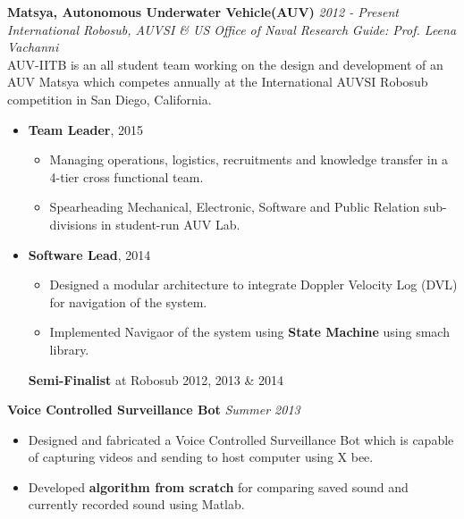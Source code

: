 \documentclass{article}
\begin{document}
    \textbf{Matsya, Autonomous Underwater Vehicle(AUV)} \hfill{\sl \small 2012 - Present}\\
    \emph{International Robosub, AUVSI \& US Office of Naval Research} \hfill{\sl \small Guide: Prof. Leena Vachanni}\\
    AUV-IITB is an all student team working on the design and development of an AUV Matsya which competes annually at the International AUVSI Robosub competition in San Diego, California.
    \vspace{-5pt}
    \begin{itemize}[itemsep = -0.75 mm, leftmargin=*]
        \item \textbf{Team Leader}, 2015
            \vspace{-5pt}
            \begin{itemize}[itemsep = -0.75 mm, leftmargin=*]
                \item Managing operations, logistics, recruitments and knowledge transfer in a 4-tier cross functional team.
                \item Spearheading Mechanical, Electronic, Software and Public Relation sub-divisions in student-run AUV Lab.
            \end{itemize}

        \item \textbf{Software Lead}, 2014
            \vspace{-5pt}
            \begin{itemize}[itemsep = -0.75 mm, leftmargin=*]
                \item Designed a modular architecture to integrate Doppler Velocity Log (DVL) for navigation of the system.
                \item Implemented Navigaor of  the system using  \textbf{State Machine} using smach library.
            \end{itemize}

            \vspace{0pt}
            \textbf{Semi-Finalist} at Robosub 2012, 2013 \& 2014
    \end{itemize}
    \vspace{10pt}
    \textbf{Voice Controlled Surveillance Bot} \hfill{\sl \small Summer 2013}\vspace{-5pt}
    \begin{itemize}[itemsep = -0.75 mm, leftmargin=*]
        \item Designed and fabricated a Voice Controlled Surveillance Bot which is capable of capturing videos and sending to host computer using X bee.
        \item Developed \textbf{algorithm from scratch} for comparing saved sound and currently recorded sound using Matlab.
    \end{itemize}
\end{document}
